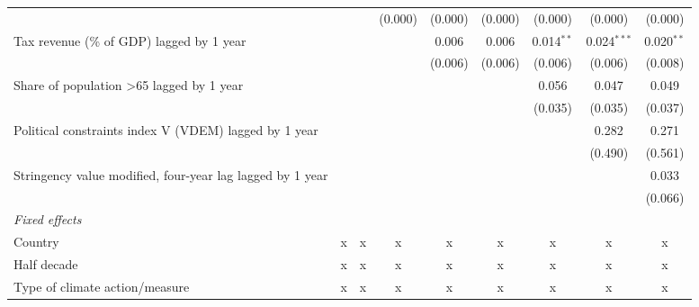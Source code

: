 \begin{tabular}{lcccccccc}
                                                             &              &              & (0.000)      & (0.000)      & (0.000)      & (0.000)      & (0.000)       & (0.000)\\   
   Tax revenue (\% of GDP) lagged by 1 year                  &              &              &              & 0.006        & 0.006        & 0.014$^{**}$ & 0.024$^{***}$ & 0.020$^{**}$\\   
                                                             &              &              &              & (0.006)      & (0.006)      & (0.006)      & (0.006)       & (0.008)\\   
   Share of population >65 lagged by 1 year                  &              &              &              &              &              & 0.056        & 0.047         & 0.049\\   
                                                             &              &              &              &              &              & (0.035)      & (0.035)       & (0.037)\\   
   Political constraints index V (VDEM) lagged by 1 year     &              &              &              &              &              &              & 0.282         & 0.271\\   
                                                             &              &              &              &              &              &              & (0.490)       & (0.561)\\   
   Stringency value modified, four-year lag lagged by 1 year &              &              &              &              &              &              &               & 0.033\\   
                                                             &              &              &              &              &              &              &               & (0.066)\\   
   \emph{Fixed effects}\\
   Country                                                   & x            & x            & x            & x            & x            & x            & x             & x\\  
   Half decade                                               & x            & x            & x            & x            & x            & x            & x             & x\\  
   Type of climate action/measure                            & x            & x            & x            & x            & x            & x            & x             & x\\  

\end{tabular}
